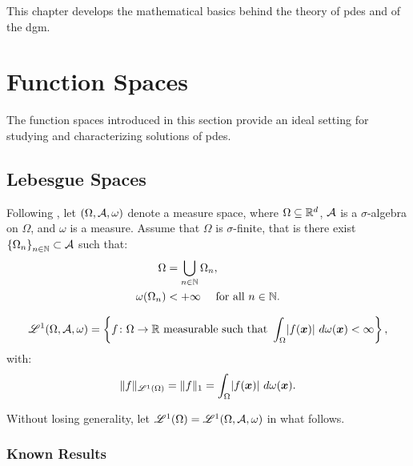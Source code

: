 This chapter develops the mathematical basics behind the theory of \acrlong{pdes} and of the \acrlong{dgm}.

\section{Function Spaces}

The function spaces introduced in this section provide an ideal setting for studying and characterizing solutions of \acrshort{pdes}.

\subsection{Lebesgue Spaces}

Following \cite[p. 89]{Brezis2010}, let $(\Omega, \mathcal{A}, \omega)$ denote a measure space, where $\Omega \subseteq \mathbb{R}^{d}$, $\mathcal{A}$ is a $\sigma$-algebra on $\Omega$, and $\omega$ is a measure. Assume that $\Omega$ is $\sigma$-finite, that is there exist $\left\{ \Omega_n \right\}_{n \in \mathbb{N}} \subset \mathcal{A}$ such that:
\begin{align}
    \Omega & = \bigcup_{n \in \mathbb{N}} \Omega_n, \\
    \omega(\Omega_n) & < +\infty \quad \text{ for all } n \in \mathbb{N}.
\end{align}

\begin{definition}
    \begin{gather}
        \mathscr{L}^{1}(\Omega, \mathcal{A}, \omega) = \left\{ f \colon \Omega \rightarrow \mathbb{R} \text{ measurable such that } \int_{\Omega} \lvert f(\bm{x}) \rvert ~ d \omega(\bm{x}) < \infty \right\},
    \end{gather}
    with:
    \begin{gather}
    \lVert f \rVert_{\mathscr{L}^{1}(\Omega)} = \lVert f \rVert_{1} = \int_{\Omega} \lvert f(\bm{x}) \rvert ~ d \omega(\bm{x}).
    \end{gather}
\end{definition}

Without losing generality, let $\mathscr{L}^{1}(\Omega) = \mathscr{L}^{1}(\Omega, \mathcal{A}, \omega)$ in what follows.

\subsubsection{Known Results}


